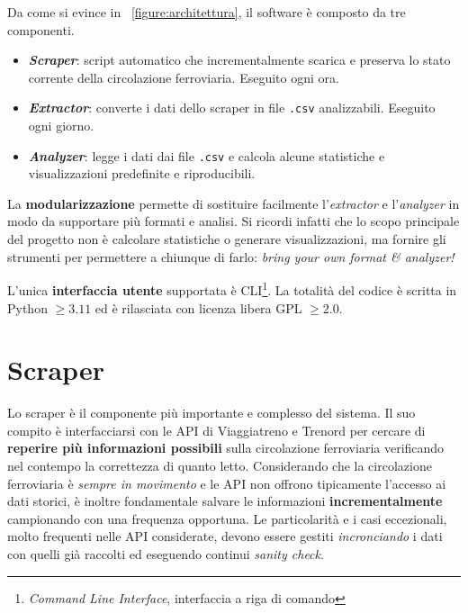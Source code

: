 \documentclass[12pt,a4paper,italian]{report}
\begin{document}
Da come si evince in \figurename~\ref{figure:architettura}, il
software è composto da tre componenti.
\begin{itemize}
    \item \textbf{\textit{Scraper}}: script automatico che
    incrementalmente scarica e preserva lo stato corrente della
    circolazione ferroviaria.  Eseguito ogni ora.
    \item \textbf{\textit{Extractor}}: converte i dati dello scraper
    in file \texttt{.csv} analizzabili.  Eseguito ogni giorno.
    \item \textbf{\textit{Analyzer}}: legge i dati dai file
    \texttt{.csv} e calcola alcune statistiche e visualizzazioni
    predefinite e riproducibili.
\end{itemize}

La \textbf{modularizzazione} permette di sostituire facilmente
l'\textit{extractor} e l'\textit{analyzer} in modo da supportare più
formati e analisi.  Si ricordi infatti che lo scopo principale del
progetto non è calcolare statistiche o generare visualizzazioni, ma
fornire gli strumenti per permettere a chiunque di farlo:
\textit{bring your own format \& analyzer!}

L'unica \textbf{interfaccia utente} supportata è
CLI\footnote{\textit{Command Line Interface}, interfaccia a riga di
    comando}.  La totalità del codice è scritta in Python $\geq 3.11$
ed è rilasciata con licenza libera GPL $\geq 2.0$.

\section{Scraper}
\label{scraper}

Lo scraper è il componente più importante e complesso del sistema.  Il
suo compito è interfacciarsi con le API di Viaggiatreno e Trenord per
cercare di \textbf{reperire più informazioni possibili} sulla
circolazione ferroviaria verificando nel contempo la correttezza di
quanto letto.  Considerando che la circolazione ferroviaria è
\textit{sempre in movimento} e le API non offrono tipicamente
l'accesso ai dati storici, è inoltre fondamentale salvare le
informazioni \textbf{incrementalmente} campionando con una frequenza
opportuna.
Le particolarità e i casi eccezionali, molto frequenti nelle API
considerate, devono essere gestiti \textit{incronciando} i dati con
quelli già raccolti ed eseguendo continui \textit{sanity check}.
\end{document}
